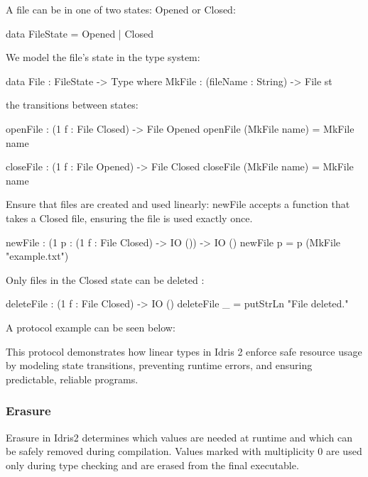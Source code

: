 \documentclass[]{rptuseminar}
\begin{document}
A file can be in one of two states: Opened or Closed:
\begin{idris} 
  
  data FileState = Opened | Closed

\end{idris}
We model the file's state in the type system:
\begin{idris}
  data File : FileState -> Type where
    MkFile : (fileName : String) -> File st

\end{idris}
the transitions between states:
\begin{idris}
  openFile : (1 f : File Closed) -> File Opened
  openFile (MkFile name) = MkFile name
  
  closeFile : (1 f : File Opened) -> File Closed
  closeFile (MkFile name) = MkFile name
  
\end{idris}
Ensure that files are created and used linearly:
newFile accepts a function that takes a Closed file, ensuring the file is used exactly once.
\begin{idris}
  newFile : (1 p : (1 f : File Closed) -> IO ()) -> IO ()
  newFile p = p (MkFile "example.txt")
    
\end{idris}
Only files in the Closed state can be deleted :
\begin{idris}
  deleteFile : (1 f : File Closed) -> IO ()
  deleteFile _ = putStrLn "File deleted."
\end{idris}
A protocol example can be seen below:
This protocol demonstrates how linear types in Idris 2 enforce safe resource usage by modeling state transitions, preventing runtime errors, and ensuring predictable, reliable programs.

\subsubsection{Erasure}
Erasure in Idris2 determines which values are needed at runtime and which can be safely removed during compilation. Values marked with multiplicity 0 are used only during type checking and are erased from the final executable.
\end{document}
